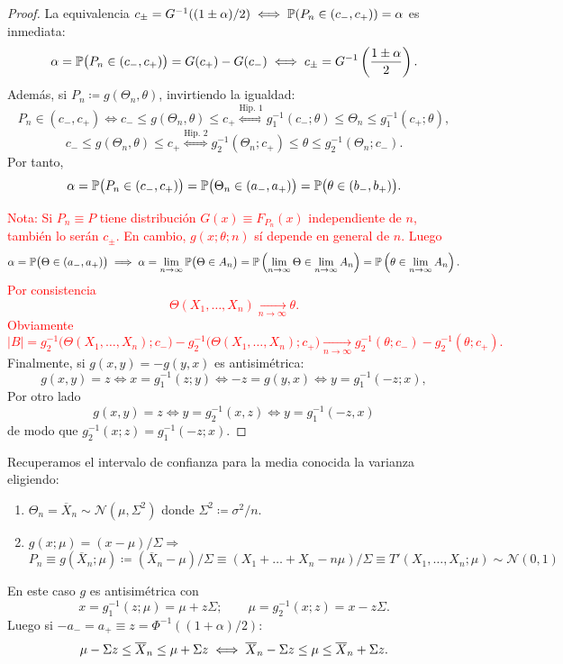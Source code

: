 \begin{proof}
La equivalencia $c_\pm = G^{-1}((1\pm\alpha)/2) \iff \mathbb{P}(P_n \in (c_-, c_+)) = \alpha$ es inmediata:
\[
  \alpha = \mathbb{P}\bigl(P_n \in (c_-, c_+)\bigr) = G(c_+) - G(c_-) \iff c_\pm = G^{-1}\left(\frac{1\pm\alpha}{2}\right).
\]
Además, si $P_n \coloneqq g(\Theta_n, \theta)$, invirtiendo la igualdad:
\[
  P_n \in (c_-, c_+) \iff c_- \le g(\Theta_n, \theta) \le c_+ \stackrel{\text{Hip.\ 1}}{\iff} g_1^{-1}(c_-; \theta) \le \Theta_n \le g_1^{-1}(c_+; \theta),
\]
\[
  c_- \le g(\Theta_n, \theta) \le c_+ \stackrel{\text{Hip.\ 2}}{\iff} g_2^{-1}(\Theta_n; c_+) \le \theta \le g_2^{-1}(\Theta_n; c_-).
\]
Por tanto,
\[
  \alpha = \mathbb{P}\bigl(P_n \in (c_-, c_+)\bigr) = \mathbb{P}\bigl(\Theta_n \in (a_-, a_+)\bigr) = \mathbb{P}\bigl(\theta \in (b_-, b_+)\bigr).
\]

\textcolor{red}{Nota:
Si $P_n \equiv P$ tiene distribución $G(x) \equiv F_{P_n}(x)$ independiente de $n$, también lo serán $c_\pm$. En cambio, $g(x; \theta; n)$ sí depende en general de $n$. Luego
\[
  \alpha = \mathbb{P}\bigl(\Theta \in (a_-, a_+)\bigr) \implies \alpha = \lim_{n \to \infty} \mathbb{P}\bigl(\Theta \in A_n\bigr)
  = \mathbb{P}\left(\lim_{n \to \infty} \Theta \in \lim_{n \to \infty} A_n\right) = \mathbb{P}\left(\theta \in \lim_{n \to \infty} A_n\right).
\]
Por consistencia
\[
  \Theta(X_1, \dots, X_n) \xrightarrow[n \to \infty]{} \theta.
\]
Obviamente
\[
  |B| = g_2^{-1}\bigl(\Theta(X_1, \dots, X_n); c_-\bigr) - g_2^{-1}\bigl(\Theta(X_1, \dots, X_n); c_+\bigr)
  \xrightarrow[n \to \infty]{} g_2^{-1}(\theta; c_-) - g_2^{-1}(\theta; c_+).
\]}
Finalmente, si $g(x,y) = -g(y,x)$ es antisimétrica:
\[
  g(x,y) = z \iff x = g_1^{-1}(z; y) \iff -z = g(y,x) \iff y = g_1^{-1}(-z; x),
\]
Por otro lado
$$g(x,y) = z \iff y=g_2^{-1}(x,z) \iff y=g_1^{-1}(-z,x)$$
de modo que $g_2^{-1}(x; z) = g_1^{-1}(-z; x)$.
\end{proof}

\begin{ejemplo}[27]
Recuperamos el intervalo de confianza para la media conocida la varianza eligiendo:
\begin{enumerate}
  \item $\Theta_n = \overline{X}_n \sim \mathcal{N}(\mu, \Sigma^2)$ donde $\Sigma^2 \coloneqq \sigma^2/n$.
  \item $g(x; \mu) = (x - \mu)/\Sigma \Rightarrow $
\[
  P_n \equiv g(\overline{X}_n; \mu) \coloneqq (\overline{X}_n - \mu)/\Sigma \equiv (X_1 + \dots + X_n - n\mu)/\Sigma \equiv T'(X_1, \dots, X_n; \mu) \sim \mathcal{N}(0,1)
\]\end{enumerate}
En este caso $g$ es antisimétrica con
\[
  x = g_1^{-1}(z; \mu) = \mu + z\Sigma; \qquad \mu = g_2^{-1}(x; z) = x - z\Sigma.
\]
Luego si $-a_- = a_+ \equiv z = \Phi^{-1}((1+\alpha)/2)$:
\[
  \mu - \Sigma z \le \overline{X}_n \le \mu + \Sigma z \iff \overline{X}_n - \Sigma z \le \mu \le \overline{X}_n + \Sigma z. \qedhere
\]
\end{ejemplo}

